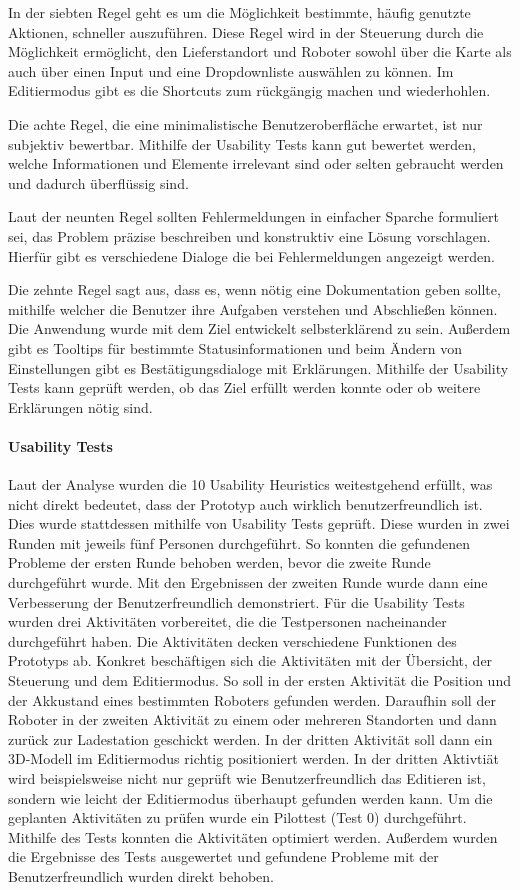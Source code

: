 In der siebten Regel geht es um die Möglichkeit bestimmte, häufig genutzte Aktionen, schneller auszuführen. Diese Regel wird in der Steuerung durch die Möglichkeit ermöglicht, den Lieferstandort und Roboter sowohl über die Karte als auch über einen Input und eine Dropdownliste auswählen zu können. Im Editiermodus gibt es die Shortcuts zum rückgängig machen und wiederhohlen.

Die achte Regel, die eine minimalistische Benutzeroberfläche erwartet, ist nur subjektiv bewertbar. Mithilfe der Usability Tests kann gut bewertet werden, welche Informationen und Elemente irrelevant sind oder selten gebraucht werden und dadurch überflüssig sind.

Laut der neunten Regel sollten Fehlermeldungen in einfacher Sparche formuliert sei, das Problem präzise beschreiben und konstruktiv eine Lösung vorschlagen. Hierfür gibt es verschiedene Dialoge die bei Fehlermeldungen angezeigt werden.

Die zehnte Regel sagt aus, dass es, wenn nötig eine Dokumentation geben sollte, mithilfe welcher die Benutzer ihre Aufgaben verstehen und Abschließen können. Die Anwendung wurde mit dem Ziel entwickelt selbsterklärend zu sein. 
Außerdem gibt es Tooltips für bestimmte Statusinformationen und beim Ändern von Einstellungen gibt es Bestätigungsdialoge mit Erklärungen. Mithilfe der Usability Tests kann geprüft werden, ob das Ziel erfüllt werden konnte oder ob weitere Erklärungen nötig sind.

\paragraph{Usability Tests}
Laut der Analyse wurden die 10 Usability Heuristics weitestgehend erfüllt, was nicht direkt bedeutet, dass der Prototyp auch wirklich benutzerfreundlich ist. Dies wurde stattdessen mithilfe von Usability Tests geprüft. Diese wurden in zwei Runden mit jeweils fünf Personen durchgeführt. So konnten die gefundenen Probleme der ersten Runde behoben werden, bevor die zweite Runde durchgeführt wurde. Mit den Ergebnissen der zweiten Runde wurde dann eine Verbesserung der Benutzerfreundlich demonstriert. Für die Usability Tests wurden drei Aktivitäten vorbereitet, die die Testpersonen nacheinander durchgeführt haben. Die Aktivitäten decken verschiedene Funktionen des Prototyps ab. Konkret beschäftigen sich die Aktivitäten mit der Übersicht, der Steuerung und dem Editiermodus. So soll in der ersten Aktivität die Position und der Akkustand eines bestimmten Roboters gefunden werden. Daraufhin soll der Roboter in der zweiten Aktivität zu einem oder mehreren Standorten und dann zurück zur Ladestation geschickt werden. In der dritten Aktivität soll dann ein 3D-Modell im Editiermodus richtig positioniert werden. In der dritten Aktivtiät wird beispielsweise nicht nur geprüft wie Benutzerfreundlich das Editieren ist, sondern wie leicht der Editiermodus überhaupt gefunden werden kann. Um die geplanten Aktivitäten zu prüfen wurde ein Pilottest (Test 0) durchgeführt. Mithilfe des Tests konnten die Aktivitäten optimiert werden. Außerdem wurden die Ergebnisse des Tests ausgewertet und gefundene Probleme mit der Benutzerfreundlich wurden direkt behoben.

